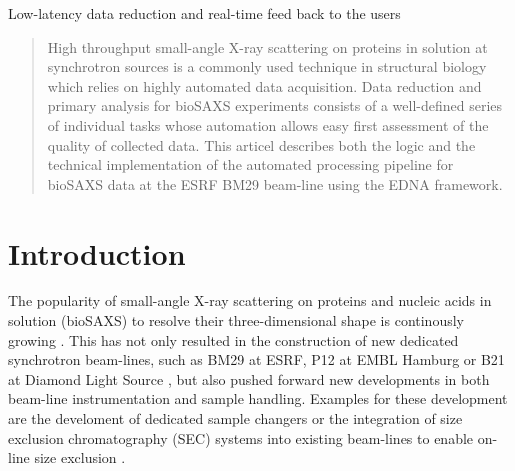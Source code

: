 \documentclass[preprint,pdf]{iucr}              %
\begin{document}
\maketitle                        %

\begin{synopsis}
Low-latency data reduction and real-time feed back to the users 
\end{synopsis}

\begin{abstract}
High throughput small-angle X-ray scattering on proteins in solution at
synchrotron sources is a commonly used technique in structural biology which
relies on highly automated data acquisition. 
Data reduction and primary analysis for bioSAXS experiments consists of a 
well-defined series of individual tasks whose automation allows easy first 
assessment of the quality of collected data.
This articel describes both the logic and the technical implementation of the
automated processing pipeline for bioSAXS data at the ESRF BM29 beam-line using
the EDNA framework.
\end{abstract}



\section{Introduction}
The popularity of small-angle X-ray scattering on proteins and nucleic acids in
solution (bioSAXS) to resolve their three-dimensional shape is continously
growing \cite{Graewert2013,Hura2009,Reyes2014}. 
This has not only resulted in the construction of new dedicated
synchrotron beam-lines, such as BM29 at ESRF, P12 at EMBL Hamburg or B21 at
Diamond Light Source \cite{BM29paper,P12,B21}, but also pushed forward new 
developments in both beam-line instrumentation and sample handling. 
Examples for these development are the develoment of dedicated sample changers
\cite{SCPaper} or the integration of size exclusion chromatography (SEC) systems
into existing beam-lines to enable on-line size exclusion \cite{SECPaper2012}.
\end{document}
